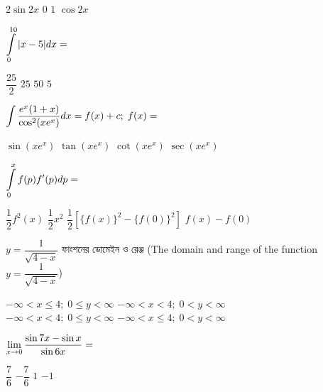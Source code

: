 \documentclass[addpoints]{exam}
\begin{document}
\begin{questions}
\begin{oneparchoices}
\choice $ 2\sin 2x $
\choice $ 0 $
\choice $ 1 $
\choice  $ \cos 2x $

\end{oneparchoices}

\question $ \mathlarger{\int\limits_{0}^{10}|x-5|dx=} $  

\begin{oneparchoices}
\choice $ \dfrac{25}{2} $
\choice $ 25 $
\choice $ 50 $
\choice $ 5 $

\end{oneparchoices}

\question  $ \mathlarger{\int\dfrac{e^{x}(1+x)}{\cos^{2}(xe^{x})}dx = f(x) + c;\; f(x) = }$

\begin{oneparchoices}
\choice $ \sin (xe^{x}) $
\choice $ \tan(xe^{x}) $
\choice $ \cot(xe^{x}) $
\choice  $ \sec(xe^{x}) $

\end{oneparchoices}


\question  $ \mathlarger{\int\limits_{0}^{x}f(p)f^{\prime}(p)dp = } $

\begin{oneparchoices}
\choice $ \dfrac{1}{2}f^{2}(x) $
\choice $ \dfrac{1}{2}x^{2} $
\choice $ \dfrac{1}{2}[\{f(x)\}^{2} - \{f(0)\}^{2}] $
\choice  $ f(x)-f(0) $

\end{oneparchoices}

\question  $ y= \dfrac{1}{\sqrt{4-x}} $ ফাংশনের ডোমেইন ও রেঞ্জ (The domain and range of the function $ y= \dfrac{1}{\sqrt{4-x}} $)
\begin{oneparchoices}
\choice $ -\infty< x\le 4;\;  0\le y<\infty $
\hspace*{.7cm} \choice $ -\infty< x< 4;\;  0< y<\infty $\\
\hspace*{-.45cm} \choice $ -\infty< x< 4;\;  0\le y<\infty $
\hspace*{.7cm} \choice $ -\infty< x\le 4;\;  0< y<\infty $

\end{oneparchoices}

\question   $ \mathlarger{\lim\limits_{x\to 0}\dfrac{\sin 7x -\sin x}{\sin 6x} = } $

\begin{oneparchoices}
\choice $ \dfrac{7}{6} $
\choice $ -\dfrac{7}{6} $
\choice $ 1 $
\choice $ -1 $

\end{oneparchoices}


\end{questions}
\end{document}

